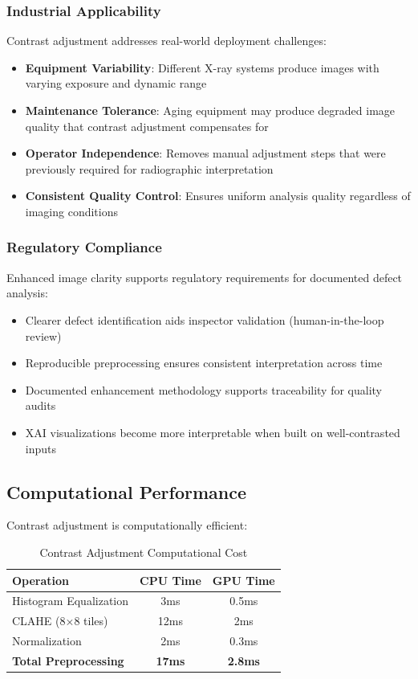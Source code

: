 \documentclass[12pt,a4paper]{report}
\begin{document}
\subsubsection{Industrial Applicability}

Contrast adjustment addresses real-world deployment challenges:

\begin{itemize}
    \item \textbf{Equipment Variability}: Different X-ray systems produce images with varying exposure and dynamic range
    \item \textbf{Maintenance Tolerance}: Aging equipment may produce degraded image quality that contrast adjustment compensates for
    \item \textbf{Operator Independence}: Removes manual adjustment steps that were previously required for radiographic interpretation
    \item \textbf{Consistent Quality Control}: Ensures uniform analysis quality regardless of imaging conditions
\end{itemize}

\subsubsection{Regulatory Compliance}

Enhanced image clarity supports regulatory requirements for documented defect analysis:

\begin{itemize}
    \item Clearer defect identification aids inspector validation (human-in-the-loop review)
    \item Reproducible preprocessing ensures consistent interpretation across time
    \item Documented enhancement methodology supports traceability for quality audits
    \item XAI visualizations become more interpretable when built on well-contrasted inputs
\end{itemize}

\subsection{Computational Performance}

Contrast adjustment is computationally efficient:

\begin{table}[H]
\centering
\caption{Contrast Adjustment Computational Cost}
\label{tab:contrast_performance}
\begin{tabular}{lcc}
\toprule
\textbf{Operation} & \textbf{CPU Time} & \textbf{GPU Time} \\
\midrule
Histogram Equalization & 3ms & 0.5ms \\
CLAHE (8×8 tiles) & 12ms & 2ms \\
Normalization & 2ms & 0.3ms \\
\midrule
\textbf{Total Preprocessing} & \textbf{17ms} & \textbf{2.8ms} \\
\bottomrule
\end{tabular}
\end{table}
\end{document}
